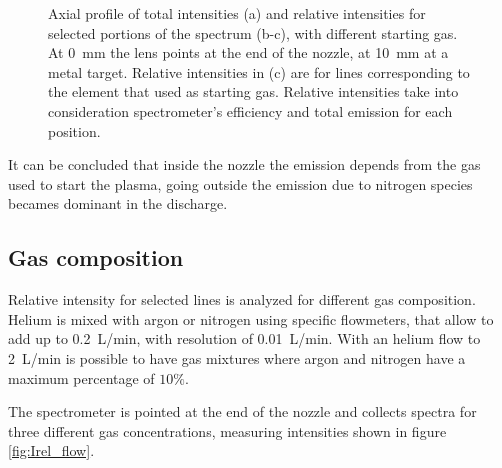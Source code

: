 \begin{figure}
  \hfill
\caption{Axial profile of total intensities (a) and relative intensities for selected portions of the spectrum (b-c), with different starting gas. At \SI{0}{\milli\meter} the lens points at the end of the nozzle, at \SI{10}{\milli\meter} at a metal target. Relative intensities in (c) are for lines corresponding to the element that used as starting gas. Relative intensities take into consideration spectrometer's efficiency and total emission for each position.}
 \label{fig:Irel_pos}
\end{figure}

It can be concluded that inside the nozzle the emission depends from the gas used to start the plasma, going outside the emission due to nitrogen species becames dominant in the discharge.


\subsection{Gas composition}
Relative intensity for selected lines is analyzed for different gas composition. Helium is mixed with argon or nitrogen using specific flowmeters, that allow to add up to \SI{0.2}{\liter/\minute}, with resolution of \SI{0.01}{\liter/\minute}.
With an helium flow to \SI{2}{\liter/\minute} is possible to have gas mixtures where argon and nitrogen have a maximum percentage of $\num{10}\%$.

The spectrometer is pointed at the end of the nozzle and collects spectra for three different gas concentrations, measuring intensities shown in figure \ref{fig:Irel_flow}.


